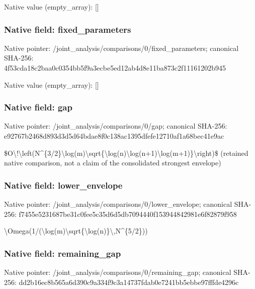 \documentclass[10pt,a4paper]{article}
\begin{document}
Native value (empty\_array): []



\subsubsection{Native field: fixed\_parameters}


Native pointer: /joint\_analysis/comparis\allowbreak{}ons/0/fixed\_parameters; canonical SHA-256: 4f53cda18c2baa0c0354bb5f\allowbreak{}9a3ecbe5ed12ab4d8e11ba87\allowbreak{}3c2f11161202b945



Native value (empty\_array): []



\subsubsection{Native field: gap}


Native pointer: /joint\_analysis/comparisons/0/gap; canonical SHA-256: e92767b2468d893d3d5d64bd\allowbreak{}ae8f0c138ac1395dfefe1271\allowbreak{}0af1a68bec41e9ac


\$O\textbackslash{}!\textbackslash{}left(N\textasciicircum{}\{3/2\}\textbackslash{}log(m)\allowbreak{}\textbackslash{}sqrt\{\textbackslash{}log(n)\textbackslash{}log(n+1)\textbackslash{}l\allowbreak{}og(m+1)\}\textbackslash{}right)\$ (retained native comparison, not a claim of the consolidated strongest envelope)


\subsubsection{Native field: lower\_envelope}


Native pointer: /joint\_analysis/comparis\allowbreak{}ons/0/lower\_envelope; canonical SHA-256: f7455e5231687be31c0fee5c\allowbreak{}35d6d5db7094440f15394484\allowbreak{}2981e6f82879f958


\textbackslash{}Omega(1/(\textbackslash{}log(m)\textbackslash{}sqrt\{\textbackslash{}\allowbreak{}log(n)\}\textbackslash{},N\textasciicircum{}\{5/2\}))


\subsubsection{Native field: remaining\_gap}


Native pointer: /joint\_analysis/comparis\allowbreak{}ons/0/remaining\_gap; canonical SHA-256: dd2b16ec8b565a6d390c9a33\allowbreak{}4f9c3a14737fdab0e7241bb5\allowbreak{}ebbe97fffde4296c
\end{document}
